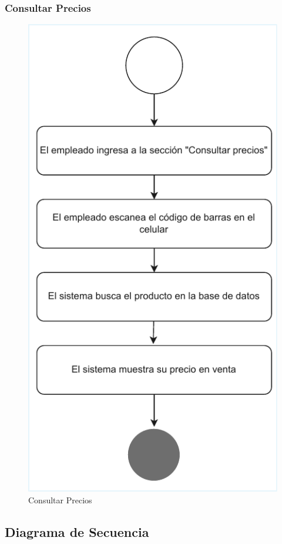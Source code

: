 \documentclass[twoside]{article}
\begin{document}
\subsubsection{Consultar Precios}
\begin{figure}[!h]
    \centering
    \includegraphics[scale=1.4]{activity3.pdf}
    \caption{Consultar Precios}
    \label{fig:enter-label}
\end{figure}
\newpage

\subsection{Diagrama de Secuencia}
\end{document}
